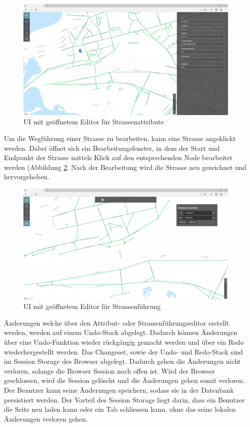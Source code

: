 \begin{figure}[H]
\centering
\includegraphics[height=6cm]{images/EditStreetattributes.png}
\caption{UI mit geöffnetem Editor für Strassenattribute}
\label{fig:editstreetattributes}
\end{figure}
\noindent
Um die Wegführung einer Strasse zu bearbeiten, kann eine Strasse angeklickt werden. Dabei öffnet sich ein Bearbeitungsfenster, in dem der Start und Endpunkt der Strasse mittels Klick auf den entsprechenden Node bearbeitet werden (Abbildung \ref{fig:editstreetdirection}. Nach der Bearbeitung wird die Strasse neu gezeichnet und hervorgehoben.\\
\begin{figure}[H]
\centering
\includegraphics[height=6cm]{images/EditStreetdirection.png}
\caption{UI mit geöffnetem Editor für Strassenführung}
\label{fig:editstreetdirection}
\end{figure}
\noindent
Änderungen welche über den Attribut-  oder Strassenführungseditor erstellt werden, werden auf einem Undo-Stack abgelegt. Dadurch können Änderungen über eine Undo-Funktion wieder rückgängig gemacht werden und über ein Redo wiederhergestellt werden. Das Changeset, sowie der Undo- und Redo-Stack sind im Session Storage des Browser abgelegt. Dadurch gehen die Änderungen nicht verloren, solange die Browser Session noch offen ist. Wird der Browser geschlossen, wird die Session gelöscht und die Änderungen gehen somit verloren. Der Benutzer kann seine Änderungen speichern, sodass sie in der Datenbank persistiert werden. Der Vorteil des Session Storage liegt darin, dass ein Benutzer die Seite neu laden kann oder ein Tab schliessen kann, ohne das seine lokalen Änderungen verloren gehen.
